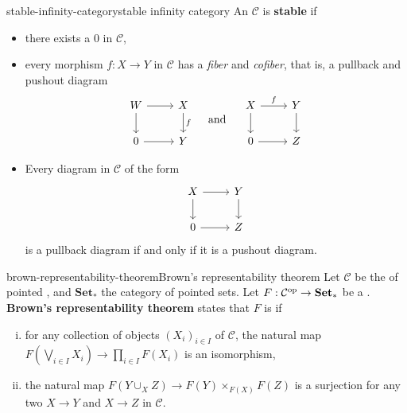 \begin{topic}{stable-infinity-category}{stable infinity category}
    An  $\mathcal{C}$ is \textbf{stable} if
    \begin{itemize}
        \item there exists a  $0$ in $\mathcal{C}$,
        \item every morphism $f : X \to Y$ in $\mathcal{C}$ has a \textit{fiber} and \textit{cofiber}, that is, a pullback and pushout diagram
        \[ \begin{tikzcd} W \arrow{r} \arrow{d} & X \arrow{d}{f} \\ 0 \arrow{r} & Y \end{tikzcd} \quad \textup{ and } \quad \begin{tikzcd} X \arrow{r}{f} \arrow{d} & Y \arrow{d} \\ 0 \arrow{r} & Z \end{tikzcd} \]
        \item Every diagram in $\mathcal{C}$ of the form
        \[ \begin{tikzcd} X \arrow{r} \arrow{d} & Y \arrow{d} \\ 0 \arrow{r} & Z \end{tikzcd} \]
        is a pullback diagram if and only if it is a pushout diagram.
    \end{itemize}
\end{topic}

\begin{topic}{brown-representability-theorem}{Brown's representability theorem}
    Let $\mathcal{C}$ be the  of  pointed , and $\textbf{Set}_*$ the category of pointed sets. Let $F : \mathcal{C}^\textup{op} \to \textbf{Set}_*$ be a . \textbf{Brown's representability theorem} states that $F$ is  if
    \begin{enumerate}[(i)]
        \item for any collection of objects $(X_i)_{i \in I}$ of $\mathcal{C}$, the natural map $F(\bigvee_{i \in I} X_i) \to \prod_{i \in I} F(X_i)$ is an isomorphism,
        \item the natural map $F(Y \cup_X Z) \to F(Y) \times_{F(X)} F(Z)$ is a surjection for any two  $X \to Y$ and $X \to Z$ in $\mathcal{C}$.
    \end{enumerate}
\end{topic}

